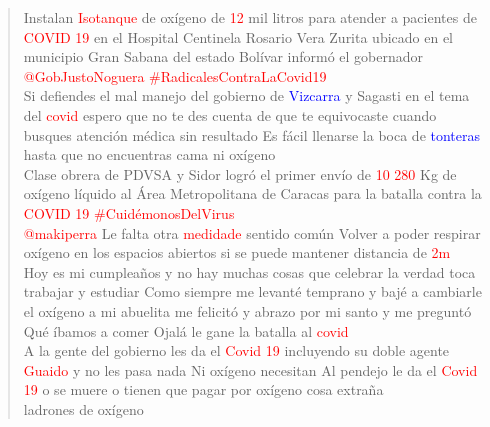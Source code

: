 \begin{quote}
	\textcolor{red}{}Instalan \textcolor{red}{Isotanque} de oxígeno de \textcolor{red}{12} mil litros para atender a pacientes de \textcolor{red}{COVID} \textcolor{red}{19} en el Hospital Centinela Rosario Vera Zurita ubicado en el municipio Gran Sabana del estado Bolívar informó el gobernador \textcolor{red}{@GobJustoNoguera} \textcolor{red}{\#RadicalesContraLaCovid19} \textcolor{red}{} 
	\vspace{12pt} \\
	\textcolor{red}{}Si defiendes el mal manejo del gobierno de \textcolor{blue}{Vizcarra} y Sagasti en el tema del \textcolor{red}{covid} espero que no te des cuenta de que te equivocaste cuando busques atención médica sin resultado Es fácil llenarse la boca de \textcolor{blue}{tonteras} hasta que no encuentras cama ni oxígeno \textcolor{red}{} 
	\vspace{12pt} \\
	\textcolor{red}{}Clase obrera de PDVSA y Sidor logró el primer envío de \textcolor{red}{10} \textcolor{red}{280} Kg de oxígeno líquido al Área Metropolitana de Caracas para la batalla contra la \textcolor{red}{COVID} \textcolor{red}{19} \textcolor{red}{\#CuidémonosDelVirus} \textcolor{red}{} 
	\vspace{12pt} \\
	\textcolor{red}{}\textcolor{red}{@makiperra} Le falta otra \textcolor{red}{medidade} sentido común Volver a poder respirar oxígeno en los espacios abiertos si se puede mantener distancia de \textcolor{red}{2m} \textcolor{red}{} 
	\vspace{12pt} \\
	\textcolor{red}{}Hoy es mi cumpleaños y no hay muchas cosas que celebrar la verdad toca trabajar y estudiar Como siempre me levanté temprano y bajé a cambiarle el oxígeno a mi abuelita me felicitó y abrazo por mi santo y me preguntó Qué íbamos a comer Ojalá le gane la batalla al \textcolor{red}{covid} \textcolor{red}{} 
	\vspace{12pt} \\
	\textcolor{red}{}A la gente del gobierno les da el \textcolor{red}{Covid} \textcolor{red}{19} incluyendo su doble agente \textcolor{red}{Guaido} y no les pasa nada Ni oxígeno necesitan Al pendejo le da el \textcolor{red}{Covid} \textcolor{red}{19} o se muere o tienen que pagar por oxígeno cosa extraña \textcolor{red}{} 
	\vspace{12pt} \\
	\textcolor{red}{}ladrones de oxígeno \textcolor{red}{} 

\end{quote}
